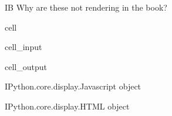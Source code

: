 \documentclass[letterpaper,10pt,english]{jupyterBook}
\begin{document}
\sphinxAtStartPar
 IB Why are these not rendering in the book?

\begin{sphinxuseclass}{cell}\begin{sphinxVerbatimInput}

\begin{sphinxuseclass}{cell_input}
\begin{sphinxVerbatim}[commandchars=\\\{\}]
   


\PYG{p}{[}\PYG{p}{]}
\end{sphinxVerbatim}

\end{sphinxuseclass}\end{sphinxVerbatimInput}
\begin{sphinxVerbatimOutput}

\begin{sphinxuseclass}{cell_output}
\begin{sphinxVerbatim}[commandchars=\\\{\}]
\PYGZlt{}IPython.core.display.Javascript object\PYGZgt{}
\end{sphinxVerbatim}

\begin{sphinxVerbatim}[commandchars=\\\{\}]
\PYGZlt{}IPython.core.display.HTML object\PYGZgt{}
\end{sphinxVerbatim}

\end{sphinxuseclass}\end{sphinxVerbatimOutput}

\end{sphinxuseclass}
\end{document}
